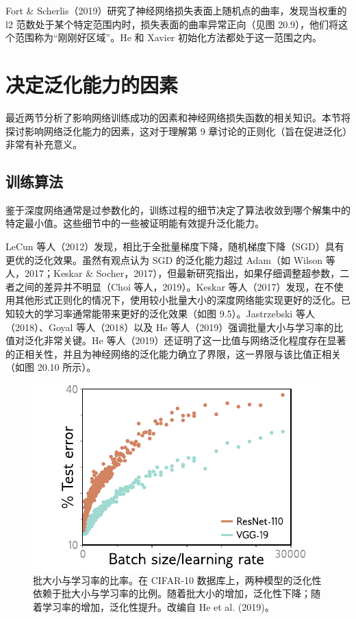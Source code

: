 \documentclass[lang=cn,newtx,10pt,scheme=chinese]{elegantbook}
\begin{document}
Fort \& Scherlis（2019）研究了神经网络损失表面上随机点的曲率，发现当权重的 l2 范数处于某个特定范围内时，损失表面的曲率异常正向（见图 20.9），他们将这个范围称为“刚刚好区域”。He 和 Xavier 初始化方法都处于这一范围之内。

\section{决定泛化能力的因素}
最近两节分析了影响网络训练成功的因素和神经网络损失函数的相关知识。本节将探讨影响网络泛化能力的因素，这对于理解第 9 章讨论的正则化（旨在促进泛化）非常有补充意义。

\subsection{训练算法}
鉴于深度网络通常是过参数化的，训练过程的细节决定了算法收敛到哪个解集中的特定最小值。这些细节中的一些被证明能有效提升泛化能力。

LeCun 等人（2012）发现，相比于全批量梯度下降，随机梯度下降（SGD）具有更优的泛化效果。虽然有观点认为 SGD 的泛化能力超过 Adam（如 Wilson 等人，2017；Keskar \& Socher，2017），但最新研究指出，如果仔细调整超参数，二者之间的差异并不明显（Choi 等人，2019）。Keskar 等人（2017）发现，在不使用其他形式正则化的情况下，使用较小批量大小的深度网络能实现更好的泛化。已知较大的学习率通常能带来更好的泛化效果（如图 9.5）。Jastrzebski 等人（2018）、Goyal 等人（2018）以及 He 等人（2019）强调批量大小与学习率的比值对泛化非常关键。He 等人（2019）还证明了这一比值与网络泛化程度存在显著的正相关性，并且为神经网络的泛化能力确立了界限，这一界限与该比值正相关（如图 20.10 所示）。

\begin{figure}[ht!]
\centering
\includegraphics[width=0.7\linewidth]{PDFFigures/UDLChap21PDF/WhyBatchSizeLearningRate.pdf}
\caption{批大小与学习率的比率。在 CIFAR-10 数据库上，两种模型的泛化性依赖于批大小与学习率的比例。随着批大小的增加，泛化性下降；随着学习率的增加，泛化性提升。改编自 He et al. (2019)。}
\end{figure}
\end{document}
